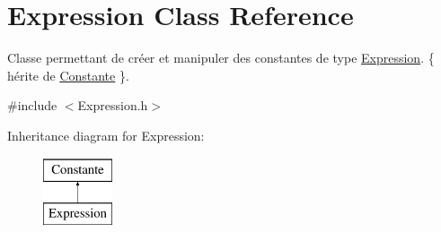 \hypertarget{classExpression}{\section{\-Expression \-Class \-Reference}
\label{classExpression}
}


\-Classe permettant de créer et manipuler des constantes de type \hyperlink{classExpression}{\-Expression}. \{ hérite de \hyperlink{classConstante}{\-Constante} \}.  




{\ttfamily \#include $<$\-Expression.\-h$>$}

\-Inheritance diagram for \-Expression\-:\begin{figure}[H]
\begin{center}
\leavevmode
\includegraphics[height=2.000000cm]{classExpression}
\end{center}
\end{figure}
